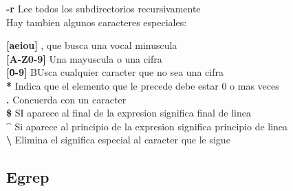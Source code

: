 \documentclass[11pt]{article}
\begin{document}
\hspace{2cm} \textbf{-r}\hspace{2cm} Lee todos los subdirectorios recursivamente\\


Hay tambien algunos caracteres especiales:\\

\vspace{2mm}

\hspace{2cm} \textbf{[aeiou]}\hspace{2cm} , que busca una vocal minuscula\\

\hspace{2cm} \textbf{[A-Z0-9]}\hspace{2cm} Una mayuscula o una cifra\\

\hspace{2cm} \textbf{[\^0-9]}\hspace{2cm} BUsca cualquier caracter que no sea una cifra\\

\hspace{2cm} \textbf{*}\hspace{2cm} Indica que el elemento que le precede debe estar 0 o mas veces \\

\hspace{2cm} \textbf{.}\hspace{2cm} Concuerda con un caracter\\

\hspace{2cm} \textbf{\$}\hspace{2cm} SI aparece al final de la expresion significa final de linea\\

\hspace{2cm} \textbf{\^}\hspace{2cm} Si aparece al principio de la expresion significa principio de linea\\

\hspace{2cm} \textbf{\textbackslash}\hspace{2cm} Elimina el significa especial al caracter que le sigue \\

\subsection {Egrep}
\end{document}
